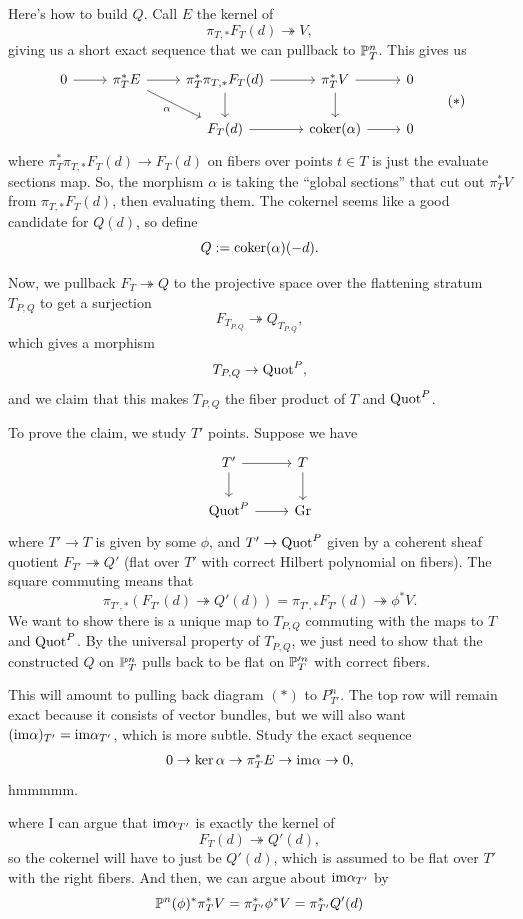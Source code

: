 \documentclass[12pt]{article}
\DeclareMathOperator{\Gr}{Gr}
\begin{document}
Here's how to build $Q$. Call $E$ the kernel of
\[\pi_{T,*} F_T(d) \twoheadrightarrow V,\]
giving us a short exact sequence that we can pullback to $\P_T^n$. This gives us
\[\begin{tikzcd}
    0 \rar & \pi_T^* E \rar \ar[dr,"\alpha"'] & \pi_T^* \pi_{T,*} F_T(d) \rar \dar & \pi_T^* V \rar \dar & 0\\
    & & F_T(d) \rar & \coker(\alpha) \rar & 0
\end{tikzcd} \tag{$*$}\]
where $\pi_T^* \pi_{T,*} F_T(d) \to F_T(d)$ on fibers over points $t\in T$ is just the evaluate sections map. So, the morphism $\alpha$ is taking the ``global sections'' that cut out $\pi_T^* V$ from $\pi_{T,*} F_T(d)$, then evaluating them. The cokernel seems like a good candidate for $Q(d)$, so define
\[Q \defeq \coker(\alpha)(-d).\]

Now, we pullback $F_T \twoheadrightarrow Q$ to the projective space over the flattening stratum $T_{P,Q}$ to get a surjection
\[F_{T_{P,Q}} \twoheadrightarrow Q_{T_{P,Q}},\]
which gives a morphism
\[T_{P,Q} \to \Quot^P,\]
and we claim that this makes $T_{P,Q}$ the fiber product of $T$ and $\Quot^P$.

To prove the claim, we study $T'$ points. Suppose we have
\[\begin{tikzcd}
    T' \dar \rar & T \dar\\
    \Quot^P \rar & \Gr
\end{tikzcd}\]
where $T'\to T$ is given by some $\phi$, and $T'\to \Quot^P$ given by a coherent sheaf quotient $F_{T'} \twoheadrightarrow Q'$ (flat over $T'$ with correct Hilbert polynomial on fibers). The square commuting means that
\[\pi_{T',*}(F_{T'}(d) \twoheadrightarrow Q'(d)) = \pi_{T',*}F_{T'}(d) \twoheadrightarrow \phi^* V.\]
We want to show there is a unique map to $T_{P,Q}$ commuting with the maps to $T$ and $\Quot^P$. By the universal property of $T_{P,Q}$, we just need to show that the constructed $Q$ on $\P_T^n$ pulls back to be flat on $\P_T'^n$ with correct fibers.

This will amount to pulling back diagram $(*)$ to $P_{T'}^n$. The top row will remain exact because it consists of vector bundles, but we will also want $(\im \alpha)_{T'} = \im \alpha_{T'}$, which is more subtle. Study the exact sequence
\[0\to \ker \alpha \to \pi_T^* E \to \im \alpha \to 0,\] 
hmmmmm.

where I can argue that $\im \alpha_{T'}$ is exactly the kernel of
\[F_T(d) \twoheadrightarrow Q'(d),\]
so the cokernel will have to just be $Q'(d)$, which is assumed to be flat over $T'$ with the right fibers. And then, we can argue about $\im \alpha_{T'}$ by
\[\P^n(\phi)^* \pi_T^* V = \pi_{T'}^* \phi^* V = \pi_{T'}^* Q'(d)\]
\end{document}

